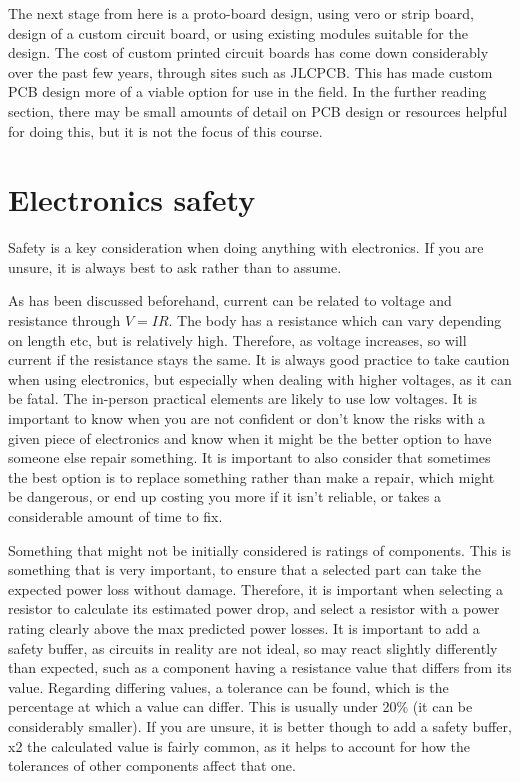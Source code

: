 \documentclass[a4paper,11pt]{report}
\begin{document}
The next stage from here is a proto-board design, using vero or strip board, design of a custom circuit board, or using existing modules suitable for the design. The cost of custom printed circuit boards has come down considerably over the past few years, through sites such as JLCPCB. This has made custom PCB design more of a viable option for use in the field.
In the further reading section, there may be small amounts of detail on PCB design or resources helpful for doing this, but it is not the focus of this course.

\section{Electronics safety}

Safety is a key consideration when doing anything with electronics. If you are unsure, it is always best to ask rather than to assume.

As has been discussed beforehand, current can be related to voltage and resistance through $V=IR$. The body has a resistance which can vary depending on length etc, but is relatively high. Therefore, as voltage increases, so will current if the resistance stays the same. It is always good practice to take caution when using electronics, but especially when dealing with higher voltages, as it can be fatal. The in-person practical elements are likely to use low voltages. It is important to know when you are not confident or don't know the risks with a given piece of electronics and know when it might be the better option to have someone else repair something. It is important to also consider that sometimes the best option is to replace something rather than make a repair, which might be dangerous, or end up costing you more if it isn't reliable, or takes a considerable amount of time to fix.

Something that might not be initially considered is ratings of components. This is something that is very important, to ensure that a selected part can take the expected power loss without damage. Therefore, it is important when selecting a resistor to calculate its estimated power drop, and select a resistor with a power rating clearly above the max predicted power losses. It is important to add a safety buffer, as circuits in reality are not ideal, so may react slightly differently than expected, such as a component having a resistance value that differs from its value.
Regarding differing values, a tolerance can be found, which is the percentage at which a value can differ. This is usually under 20\% (it can be considerably smaller). If you are unsure, it is better though to add a safety buffer, x2 the calculated value is fairly common, as it helps to account for how the tolerances of other components affect that one.
\end{document}

